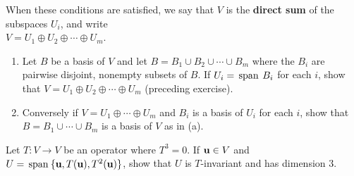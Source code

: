 \begin{multicols}{2}
\begin{ex}
\begin{enumerate}[label={\roman*.}]
\end{enumerate}

When these conditions are satisfied, we say that $V$ is the \textbf{direct sum} of the subspaces $U_{i}$, and write \\ $V = U_{1} \oplus U_{2} \oplus \cdots \oplus U_{m}$.
\end{ex}

\begin{ex}
\begin{enumerate}[label={\alph*.}]
\item Let $B$ be a basis of $V$ and let $B = B_{1} \cup B_{2} \cup \cdots  \cup B_{m}$ where the $B_{i}$ are pairwise disjoint, nonempty subsets of $B$. If $U_{i} = \thinspace\operatorname{span \medspace}B_{i}$ for each $i$, show that $V = U_{1} \oplus U_{2} \oplus \cdots \oplus U_{m}$ (preceding exercise).

\item Conversely if $V = U_{1} \oplus \cdots \oplus U_{m}$ and $B_{i}$ is a basis of $U_{i}$ for each $i$, show that $B = B_{1} \cup \cdots \cup B_{m}$ is a basis of $V$ as in (a).

\end{enumerate}
\end{ex}

\begin{ex}
Let $T: V \to V$ be an operator where $T^3=0$. If $\textbf{u} \in V$ and $U = \thinspace\operatorname{span\medspace}\{\textbf{u},T(\textbf{u}), T^2(\textbf{u})\}$, show that $U$ is $T$-invariant and has dimension $3$. 
\end{ex}
\end{multicols}
